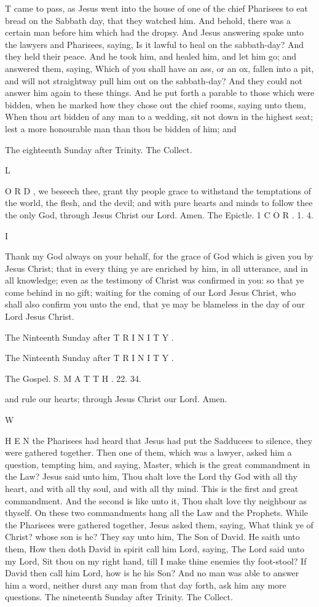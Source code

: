 T came to pass, as Jesus went into the house of one of the chief Pharisees to eat bread on the Sabbath day, that they watched him. And behold, there was a certain man before him which had the dropsy. And Jesus answering spake unto the lawyers and Pharisees, saying, Is it lawful to heal on the sabbath-day? And they held their peace. And he took him, and healed him, and let him go; and answered them, saying, Which of you shall have an ass, or an ox, fallen into a pit, and will not straightway pull him out on the sabbath-day? And they could not answer him again to these things. And he put forth a parable to those which were bidden, when he marked how they chose out the chief rooms, saying unto them, When thou art bidden of any man to a wedding, sit not down in the highest seat; lest a more honourable man than thou be bidden of him; and

The eighteenth Sunday after Trinity. The Collect.

L

O R D , we beseech thee, grant thy people grace to withstand the temptations of the world, the flesh, and the devil; and with pure hearts and minds to follow thee the only God, through Jesus Christ our Lord. Amen. The Epictle. 1 C O R . 1. 4.

I

Thank my God always on your behalf, for the grace of God which is given you by Jesus Christ; that in every thing ye are enriched by him, in all utterance, and in all knowledge; even as the testimony of Christ was confirmed in you: so that ye come behind in no gift; waiting for the coming of our Lord Jesus Christ, who shall also confirm you unto the end, that ye may be blameless in the day of our Lord Jesus Christ.

The Ninteenth Sunday after T R I N I T Y .

The Ninteenth Sunday after T R I N I T Y .

The Gospel. S. M A T T H . 22. 34.

and rule our hearts; through Jesus Christ our Lord. Amen.

W

H E N the Pharisees had heard that Jesus had put the Sadducees to silence, they were gathered together. Then one of them, which was a lawyer, asked him a question, tempting him, and saying, Master, which is the great commandment in the Law? Jesus said unto him, Thou shalt love the Lord thy God with all thy heart, and with all thy soul, and with all thy mind. This is the first and great commandment. And the second is like unto it, Thou shalt love thy neighbour as thyself. On these two commandments hang all the Law and the Prophets. While the Pharisees were gathered together, Jesus asked them, saying, What think ye of Christ? whose son is he? They say unto him, The Son of David. He saith unto them, How then doth David in spirit call him Lord, saying, The Lord said unto my Lord, Sit thou on my right hand, till I make thine enemies thy foot-stool? If David then call him Lord, how is he his Son? And no man was able to answer him a word, neither durst any man from that day forth, ask him any more questions. The nineteenth Sunday after Trinity. The Collect.

